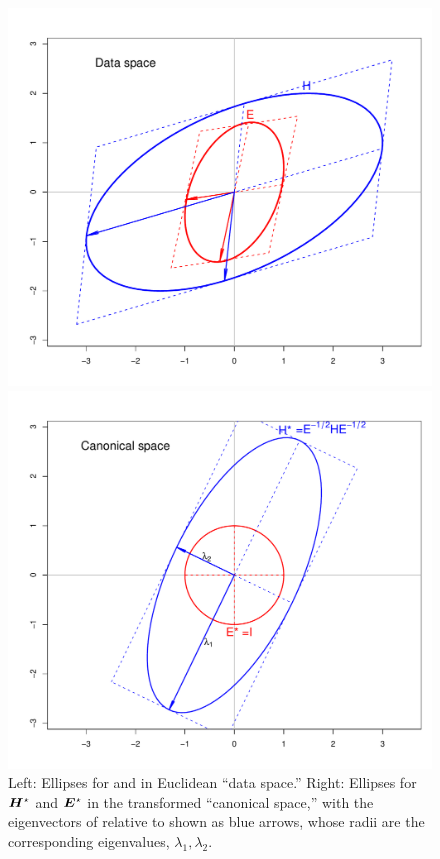 \begin{figure}[htb]
  \begin{minipage}[c]{.495\textwidth}
   \includegraphics[width=1\linewidth,clip]{fig/ellipse-geneig1}
   \end{minipage}%
  \hfill
  \begin{minipage}[c]{.495\textwidth}
   \includegraphics[width=1\linewidth,clip]{fig/ellipse-geneig2}
  \end{minipage}
  \caption{Left: Ellipses for  and  in Euclidean ``data space.''
   Right: Ellipses for $\bm{H}^\star$ and $\bm{E}^\star$ in the transformed ``canonical space,''
   with the eigenvectors of  relative to  shown as blue arrows, whose radii
   are the corresponding eigenvalues, $\lambda_1, \lambda_2$. }%
  \label{fig:ellipse-geneig}
\end{figure}
